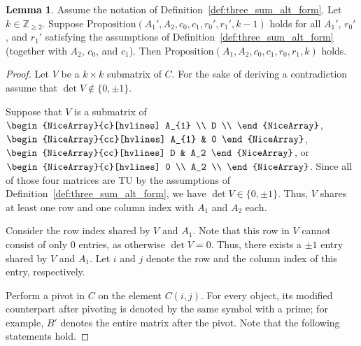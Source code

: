 \documentclass{article}
\theoremstyle{definition}
\newtheorem{lemma}[theorem]{Lemma}
\begin{document}
\begin{lemma}\label{lem:three_sum_alt_form_k_TU_induction}
    Assume the notation of Definition~\ref{def:three_sum_alt_form}. Let $k \in \mathbb{Z}_{\geq 2}$. Suppose $\mathrm{Proposition}(A_{1}', A_{2}, c_{0}, c_{1}, r_{0}', r_{1}', k - 1)$ holds for all $A_{1}'$, $r_{0}'$, and $r_{1}'$ satisfying the assumptions of Definition~\ref{def:three_sum_alt_form} (together with $A_{2}$, $c_{0}$, and $c_{1}$). Then $\mathrm{Proposition}(A_{1}, A_{2}, c_{0}, c_{1}, r_{0}, r_{1}, k)$ holds.
\end{lemma}

\begin{proof}
    Let $V$ be a $k \times k$ submatrix of $C$. For the sake of deriving a contradiction assume that $\det V \notin \{0, \pm 1\}$.

    Suppose that $V$ is a submatrix of $\begin{NiceArray}{c}[hvlines] A_{1} \\ D \\ \end{NiceArray}$, $\begin{NiceArray}{cc}[hvlines] A_{1} & 0 \end{NiceArray}$, $\begin{NiceArray}{cc}[hvlines] D & A_2 \end{NiceArray}$, or $\begin{NiceArray}{c}[hvlines] 0 \\ A_2 \\ \end{NiceArray}$. Since all of those four matrices are TU by the assumptions of Definition~\ref{def:three_sum_alt_form}, we have $\det V \in \{0, \pm 1\}$. Thus, $V$ shares at least one row and one column index with $A_{1}$ and $A_{2}$ each.

    Consider the row index shared by $V$ and $A_{1}$. Note that this row in $V$ cannot consist of only $0$ entries, as otherwise $\det V = 0$. Thus, there exists a $\pm 1$ entry shared by $V$ and $A_{1}$. Let $i$ and $j$ denote the row and the column index of this entry, respectively.

    Perform a pivot in $C$ on the element $C (i, j)$. For every object, its modified counterpart after pivoting is denoted by the same symbol with a prime; for example, $B'$ denotes the entire matrix after the pivot. Note that the following statements hold.


\end{proof}
\end{document}
